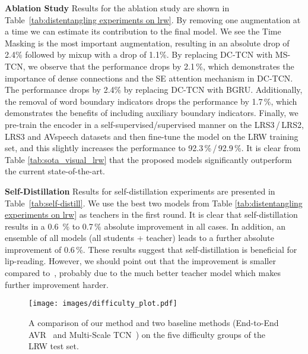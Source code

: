 \documentclass{article}
\begin{document}
\noindent\textbf{Ablation Study}\quad
Results for the ablation study are shown in Table~\ref{tab:distentangling experiments on lrw}.
By removing one augmentation at a time we can estimate its contribution to the final model. We see the Time Masking is the most important augmentation, resulting in an absolute drop of 2.4\% followed by mixup with a drop of 1.1\%.
By replacing DC-TCN with MS-TCN, we observe that the performance drops by 2.1\,\%, which demonstrates the importance of dense connections and the SE attention mechanism in DC-TCN. The performance  drops by 2.4\% by replacing DC-TCN with BGRU. Additionally, the removal of word boundary indicators drops the performance by 1.7\,\%, which demonstrates the benefits of including auxiliary boundary indicators. Finally, we pre-train the encoder in a self-supervised/supervised manner on the LRS3\,/\,LRS2, LRS3 and AVspeech datasets and then fine-tune the  model on the LRW training set, and this slightly increases the performance to 92.3\,\%\,/\,92.9\,\%. It is clear from Table \ref{tab:sota_visual_lrw} that the proposed models significantly outperform the current state-of-the-art.

\noindent\textbf{Self-Distillation}\quad
Results for self-distillation experiments are presented in Table~\ref{tab:self-distill}. We use the best two models from Table \ref{tab:distentangling experiments on lrw} as teachers in the first round. It is clear that self-distillation results in a 0.6 \,\% to 0.7\,\%  absolute improvement in all cases. In addition, an ensemble of all models (all students + teacher) leads to a further absolute improvement of 0.6\,\%. These results suggest that self-distillation is beneficial for lip-reading. However, we should point out that the improvement is smaller compared to~\cite{ma2020towards}, probably due to the much better teacher model which makes further improvement harder.


\begin{figure}[!t]
  \centering
  \texttt{[image: images/difficulty\_plot.pdf]}
  \vspace{-0.5cm}
  \caption{A comparison of our method and two baseline methods (End-to-End AVR~\cite{petridis2018end} and Multi-Scale TCN~\cite{martinez2020lipreading}) on the five difficulty groups of the LRW test set. }
  \label{difficulty_comparsion}
  \vspace{-0.4cm}
\end{figure}
\end{document}
